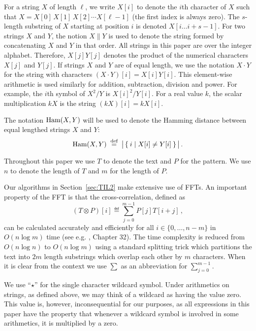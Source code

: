 \documentclass[11pt]{article}
\newcommand{\ham}{\ensuremath{\textup{Ham}}}
\newcommand{\concat}{\|}
\newcommand{\upto}{\ldots}
\newcommand{\wildcard}{\ensuremath{\star}\xspace}
\theoremstyle{plain}
\theoremstyle{definition}
\begin{document}
For a string $X$ of length $\ell$, we write $X[i]$ to denote the $i$th character of $X$ such that $X=X[0]\,X[1]\,X[2]\cdots X[\ell-1]$ (the first index is always zero). The $s$-length substring of $X$ starting at position $i$ is denoted $X[i\upto i+s-1]$. For two strings $X$ and $Y$, the notion $X\concat Y$ is used to denote the string formed by concatenating $X$ and $Y$ in that order. All strings in this paper are over the integer alphabet. Therefore, $X[j]Y[j]$ denotes the product of the numerical characters $X[j]$ and $Y[j]$. If strings $X$ and $Y$ are of equal length, we use the notation $X\cdot Y$ for the string with characters $(X\cdot Y)[i]=X[i]Y[i]$. This element-wise arithmetic is used similarly for addition, subtraction, division and power. For example, the $i$th symbol of $X^2 / Y$ is $X[i]^2/Y[i]$. For a real value $k$, the scalar multiplication $kX$ is the string $(kX)[i]=kX[i]$.

The notation $\ham(X,Y)$ will be used to denote the Hamming distance between equal lengthed strings $X$ and $Y$:
\begin{equation*}
   \ham(X,Y) \eqdef \big|\Set{i | X[i] \neq Y[i] } \big| \,.
\end{equation*}

Throughout this paper we use $T$ to denote the text and $P$ for the pattern. We use $n$ to denote the length of $T$ and $m$ for the length of $P$.

Our algorithms in Section~\ref{sec:TIL2} make extensive use of FFTs.  An important property of the FFT is that the cross-correlation, defined as
\begin{equation*}
    (T \otimes P)[i] \eqdef \sum_{j=0}^{m-1}P[j] T[{i+j}] \,,
\end{equation*}
can be calculated accurately and efficiently for all $i\in\{0,\dots,n-m\}$ in $O(n \log m)$ time (see e.g. \cite{Cormen:1990}, Chapter 32). The time complexity is reduced from $O(n\log{n})$ to $O(n\log{m})$ using a standard splitting trick which partitions the text into $2m$ length substrings which overlap each other by $m$ characters. When it is clear from the context we use $\sum$ as an abbreviation for $\sum_{j=0}^{m-1}$.

We use ``\wildcard'' for the single character wildcard symbol. Under arithmetics on strings, as defined above, we may think of a wildcard as having the value zero. This value is, however, inconsequential for our purposes, as all expressions in this paper have the property that whenever a wildcard symbol is involved in some arithmetics, it is multiplied by a zero.
\end{document}
